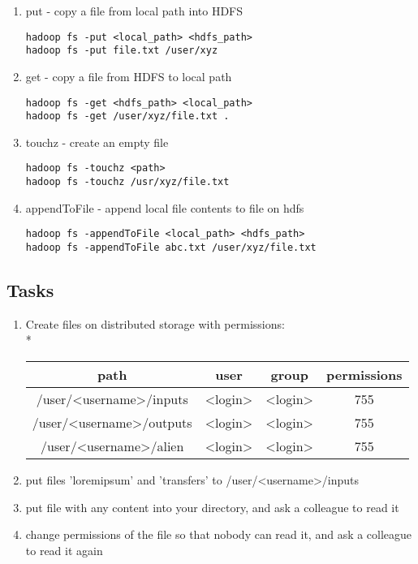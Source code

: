 \documentclass[11pt]{article}
\begin{document}
\begin{enumerate}
\item put - copy a file from local path into HDFS
\begin{lstlisting}
hadoop fs -put <local_path> <hdfs_path>
hadoop fs -put file.txt /user/xyz
\end{lstlisting}

\pagebreak

\item get - copy a file from HDFS to local path
\begin{lstlisting}
hadoop fs -get <hdfs_path> <local_path>
hadoop fs -get /user/xyz/file.txt .
\end{lstlisting}

\item touchz - create an empty file
\begin{lstlisting}
hadoop fs -touchz <path>
hadoop fs -touchz /usr/xyz/file.txt
\end{lstlisting}

\item appendToFile - append local file contents to file on hdfs
\begin{lstlisting}
hadoop fs -appendToFile <local_path> <hdfs_path>
hadoop fs -appendToFile abc.txt /user/xyz/file.txt
\end{lstlisting}

\end{enumerate}

\subsection*{Tasks}

\begin{enumerate}
\item Create files on distributed storage with permissions:\\*

\begin{tabular}{c | c | c | c}
	path & user & group & permissions \\ \hline 
	/user/<username>/inputs & <login> & <login> & 755 \\
	/user/<username>/outputs & <login> & <login> & 755 \\
	/user/<username>/alien & <login> & <login> & 755 \\
\end{tabular}

\item put files 'loremipsum' and 'transfers' to /user/<username>/inputs
\item put file with any content into your directory, and ask a colleague to read it
\item change permissions of the file so that nobody can read it, and ask a colleague to read it again
\end{enumerate}
\end{document}
